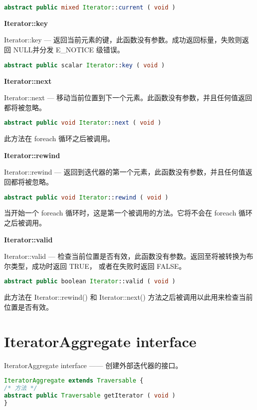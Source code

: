 \begin{lstlisting}[language=PHP]
abstract public mixed Iterator::current ( void )
\end{lstlisting}

\textbf{Iterator::key}


Iterator::key — 返回当前元素的键，此函数没有参数。成功返回标量，失败则返回 NULL并分发 E\_NOTICE 级错误。

\begin{lstlisting}[language=PHP]
abstract public scalar Iterator::key ( void )
\end{lstlisting}


\textbf{Iterator::next}

Iterator::next — 移动当前位置到下一个元素。此函数没有参数，并且任何值返回都将被忽略。

\begin{lstlisting}[language=PHP]
abstract public void Iterator::next ( void )
\end{lstlisting}

此方法在 foreach 循环之后被调用。

\textbf{Iterator::rewind}

Iterator::rewind — 返回到迭代器的第一个元素，此函数没有参数，并且任何值返回都将被忽略。

\begin{lstlisting}[language=PHP]
abstract public void Iterator::rewind ( void )
\end{lstlisting}

当开始一个 foreach 循环时，这是第一个被调用的方法。它将不会在 foreach 循环之后被调用。


\textbf{Iterator::valid}

Iterator::valid — 检查当前位置是否有效，此函数没有参数。返回至将被转换为布尔类型，成功时返回 TRUE， 或者在失败时返回 FALSE。

\begin{lstlisting}[language=PHP]
abstract public boolean Iterator::valid ( void )
\end{lstlisting}

此方法在 Iterator::rewind() 和 Iterator::next() 方法之后被调用以此用来检查当前位置是否有效。


\section{IteratorAggregate interface}

IteratorAggregate interface —— 创建外部迭代器的接口。


\begin{lstlisting}[language=PHP]
IteratorAggregate extends Traversable {
/* 方法 */
abstract public Traversable getIterator ( void )
}
\end{lstlisting}


